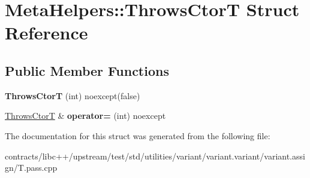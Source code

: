 \hypertarget{struct_meta_helpers_1_1_throws_ctor_t}{}\section{Meta\+Helpers\+:\+:Throws\+CtorT Struct Reference}
\label{struct_meta_helpers_1_1_throws_ctor_t}
\subsection*{Public Member Functions}
\begin{DoxyCompactItemize}
\item 
\mbox{\label{struct_meta_helpers_1_1_throws_ctor_t_ae97d0bc6d1f820d5376f60e19d7146c1}} 
{\bfseries Throws\+CtorT} (int) noexcept(false)
\item 
\mbox{\label{struct_meta_helpers_1_1_throws_ctor_t_ac920cb186984502212cf059b68e7844e}} 
\mbox{\hyperlink{struct_meta_helpers_1_1_throws_ctor_t}{Throws\+CtorT}} \& {\bfseries operator=} (int) noexcept
\end{DoxyCompactItemize}


The documentation for this struct was generated from the following file\+:\begin{DoxyCompactItemize}
\item 
contracts/libc++/upstream/test/std/utilities/variant/variant.\+variant/variant.\+assign/T.\+pass.\+cpp\end{DoxyCompactItemize}
